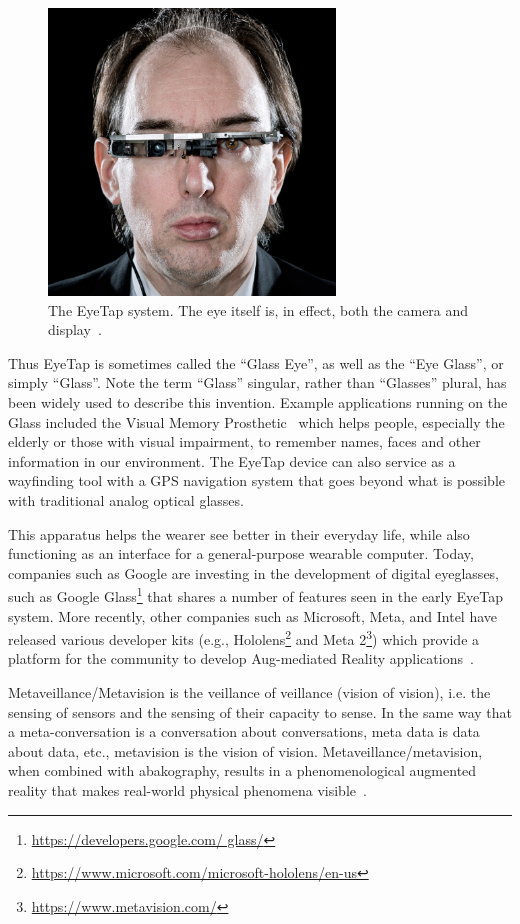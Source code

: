 \begin{figure}
  \center
  \includegraphics[width=3.0in]{ch1/figures/eyetap.jpg}
  \caption{The EyeTap system. The eye itself is, in effect, both the camera and display~\cite{mann2013steve}.}
  \label{fig:eyetap_mann_black}
\end{figure}

Thus EyeTap is sometimes called the ``Glass Eye'', as well as the ``Eye Glass'', or simply ``Glass''. 
Note the term ``Glass'' singular, rather than ``Glasses'' plural, has been widely used to describe this 
invention. Example applications running on the Glass included the Visual Memory 
Prosthetic~\cite{mannaaai361} which helps people, especially the elderly or those with visual 
impairment, to remember names, faces and other information in our environment. The EyeTap device 
can also service as a wayfinding tool with a GPS navigation system that goes beyond what is possible 
with traditional analog optical glasses. 

This apparatus helps the wearer see better in their everyday life, while also functioning as an interface 
for a general-purpose wearable computer. Today, companies such as Google are investing in the 
development of digital eyeglasses, such as Google Glass\footnote{\url{https://developers.google.com/
glass/}} that shares a number of features seen in the early EyeTap system. More recently, other 
companies such as Microsoft, Meta, and Intel have released various developer kits (e.g., 
Hololens\footnote{\url{https://www.microsoft.com/microsoft-hololens/en-us}} and Meta 
2\footnote{\url{https://www.metavision.com/}}) which provide a platform for the community to develop 
Aug-mediated Reality applications~\cite{mann1994mediated}.

Metaveillance/Metavision is the veillance of veillance (vision of vision), i.e. the sensing of sensors and the sensing of their capacity to sense. In the same way that a meta-conversation is a conversation about conversations, meta data is data about data, etc., metavision is the vision of vision. Metaveillance/metavision, when combined with abakography, results in a phenomenological augmented reality that makes real-world physical phenomena visible~\cite{toposculpting_ccece2014}.

